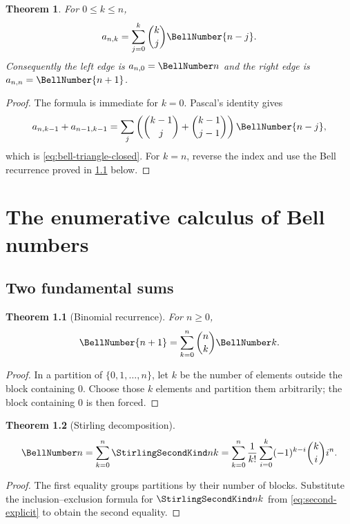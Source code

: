 \documentclass[11pt,a4paper,oneside,openany]{book}
\newtheorem{theorem}{Theorem}[chapter]
\theoremstyle{definition}
\theoremstyle{remark}
\begin{document}
\begin{theorem}
For $0\le k\le n$,
\begin{equation}\label{eq:bell-triangle-closed}
 a_{n,k}=\sum_{j=0}^{k}\binom{k}{j}\BellNumber{n-j}.
\end{equation}
Consequently the left edge is $a_{n,0}=\BellNumber n$ and the right edge is
$a_{n,n}=\BellNumber{n+1}$.
\end{theorem}
\begin{proof}
The formula is immediate for $k=0$.  Pascal's identity gives
\[
 a_{n,k-1}+a_{n-1,k-1}
 =\sum_j\left(\binom{k-1}{j}+\binom{k-1}{j-1}\right)\BellNumber{n-j},
\]
which is \eqref{eq:bell-triangle-closed}.  For $k=n$, reverse the index and use
the Bell recurrence proved in \cref{thm:bell-binomial-recurrence} below.
\end{proof}

\chapter{The enumerative calculus of Bell numbers}

\section{Two fundamental sums}
\begin{theorem}[Binomial recurrence]\label{thm:bell-binomial-recurrence}
For $n\ge0$,
\begin{equation}\label{eq:bell-binomial-recurrence}
 \BellNumber{n+1}=\sum_{k=0}^{n}\binom nk\BellNumber k.
\end{equation}
\end{theorem}
\begin{proof}
In a partition of $\{0,1,\ldots,n\}$, let $k$ be the number of elements outside
the block containing $0$.  Choose those $k$ elements and partition them
arbitrarily; the block containing $0$ is then forced.
\end{proof}

\begin{theorem}[Stirling decomposition]\label{thm:bell-stirling-sum}
\begin{equation}\label{eq:bell-stirling-sum}
 \BellNumber n=\sum_{k=0}^{n}\StirlingSecondKind nk
 =\sum_{k=0}^{n}\frac1{k!}\sum_{i=0}^{k}(-1)^{k-i}\binom ki i^n.
\end{equation}
\end{theorem}
\begin{proof}
The first equality groups partitions by their number of blocks.  Substitute the
inclusion--exclusion formula for $\StirlingSecondKind nk$ from
\cref{eq:second-explicit} to obtain the second equality.
\end{proof}
\end{document}
